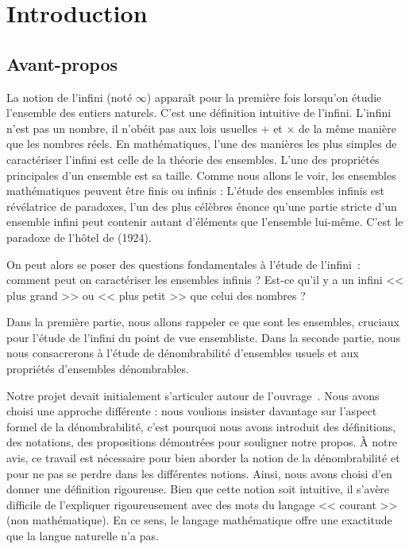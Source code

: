 \documentclass[a4paper,french,final]{memoir}
\begin{document}
\begin{titlingpage}

\end{titlingpage}
\hypersetup{pageanchor=true}
\frontmatter
\tableofcontents
\part{Introduction}
\chapter{Avant-propos}

La notion de l'infini (noté $\infty$) apparaît pour la première fois lorsqu'on étudie l'ensemble des entiers naturels. C'est une définition intuitive de l'infini. L'infini n'est pas un nombre, il n'obéit pas aux lois usuelles $+$ et $\times$ de la même manière que les nombres réels. En mathématiques, l'une des manières les plus simples de caractériser l'infini est celle de la théorie des ensembles. L'une des propriétés principales d'un ensemble est sa taille. Comme nous allons le voir, les ensembles mathématiques peuvent être finis ou infinis : L'étude des ensembles infinis est révélatrice de paradoxes, l'un des plus célèbres  énonce qu'une partie stricte d'un ensemble infini peut contenir autant d'éléments que l'ensemble lui-même. C'est le paradoxe de l'hôtel de  (1924).

On peut alors se poser des questions fondamentales à l'étude de l'infini~: comment peut on caractériser les ensembles infinis ? Est-ce qu'il y a un infini << plus grand >> ou << plus petit >> que celui des nombres ?  

Dans la première partie, nous allons rappeler ce que sont les ensembles, cruciaux pour l'étude de l'infini du point de vue ensembliste.
Dans la seconde partie, nous nous consacrerons à l'étude de dénombrabilité d'ensembles usuels et aux propriétés d'ensembles dénombrables.

Notre projet devait initialement s'articuler autour de l'ouvrage~\cite{livre_ter}. Nous avons choisi une approche différente : nous voulions insister davantage sur l'aspect formel de la dénombrabilité, c'est pourquoi nous avons introduit des définitions, des notations, des propositions démontrées pour souligner notre propos. \`A notre avis, ce travail est nécessaire pour bien aborder la notion de la dénombrabilité et pour ne pas se perdre dans les différentes notions. Ainsi, nous avons choisi d'en donner une définition rigoureuse. Bien que cette notion soit intuitive, il s'avère difficile de l'expliquer rigoureusement avec des mots du langage << courant >> (non mathématique). En ce sens, le langage mathématique offre une exactitude que la langue naturelle n'a pas.
\end{document}
